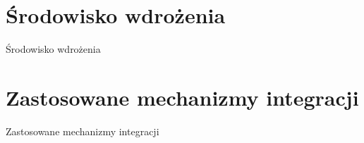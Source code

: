 \section{Środowisko wdrożenia}
\label{sec:srodowiskoWdrozenia}

Środowisko wdrożenia


\section{Zastosowane mechanizmy integracji}
\label{sec:integracja}

Zastosowane mechanizmy integracji

